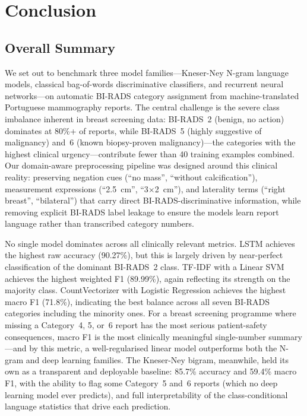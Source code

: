 \documentclass[11pt,a4paper]{article}
\begin{document}
\section{Conclusion}

\subsection{Overall Summary}

We set out to benchmark three model families---Kneser-Ney N-gram language
models, classical bag-of-words discriminative classifiers, and recurrent neural
networks---on automatic BI-RADS category assignment from machine-translated
Portuguese mammography reports.
The central challenge is the severe class imbalance inherent in breast screening
data: BI-RADS~2 (benign, no action) dominates at 80\%+ of reports, while
BI-RADS~5 (highly suggestive of malignancy) and~6 (known biopsy-proven
malignancy)---the categories with the highest clinical urgency---contribute
fewer than 40 training examples combined.
Our domain-aware preprocessing pipeline was designed around this clinical
reality: preserving negation cues (``no mass'', ``without calcification''),
measurement expressions (``2.5~cm'', ``3$\times$2~cm''), and laterality terms
(``right breast'', ``bilateral'') that carry direct BI-RADS-discriminative
information, while removing explicit BI-RADS label leakage to ensure the
models learn report language rather than transcribed category numbers.

No single model dominates across all clinically relevant metrics.
LSTM achieves the highest raw accuracy (90.27\%), but this is largely driven
by near-perfect classification of the dominant BI-RADS~2 class.
TF-IDF with a Linear SVM achieves the highest weighted F1 (89.99\%), again
reflecting its strength on the majority class.
CountVectorizer with Logistic Regression achieves the highest macro F1
(71.8\%), indicating the best balance across all seven BI-RADS categories
including the minority ones.
For a breast screening programme where missing a Category~4, 5, or~6 report
has the most serious patient-safety consequences, macro F1 is the most
clinically meaningful single-number summary---and by this metric, a
well-regularised linear model outperforms both the N-gram and deep learning
families.
The Kneser-Ney bigram, meanwhile, held its own as a transparent and deployable
baseline: 85.7\% accuracy and 59.4\% macro F1, with the ability to flag
some Category~5 and~6 reports (which no deep learning model ever predicts),
and full interpretability of the class-conditional language statistics
that drive each prediction.
\end{document}
